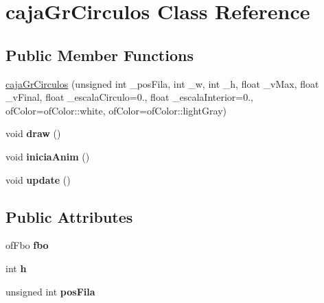 \hypertarget{classcaja_gr_circulos}{}\section{caja\+Gr\+Circulos Class Reference}
\label{classcaja_gr_circulos}
\subsection*{Public Member Functions}
\begin{DoxyCompactItemize}
\item 
\hyperlink{classcaja_gr_circulos_a54ebb2fafbbc7bd4aa13d934d52040a7}{caja\+Gr\+Circulos} (unsigned int \+\_\+pos\+Fila, int \+\_\+w, int \+\_\+h, float \+\_\+v\+Max, float \+\_\+v\+Final, float \+\_\+escala\+Circulo=0., float \+\_\+escala\+Interior=0., of\+Color=of\+Color\+::white, of\+Color=of\+Color\+::light\+Gray)
\item 
\hypertarget{classcaja_gr_circulos_af5b406775d6dc3d4226614bd13920b91}{}void {\bfseries draw} ()\label{classcaja_gr_circulos_af5b406775d6dc3d4226614bd13920b91}

\item 
\hypertarget{classcaja_gr_circulos_a5bf88c348cc168c6c1dfbb113c258a98}{}void {\bfseries inicia\+Anim} ()\label{classcaja_gr_circulos_a5bf88c348cc168c6c1dfbb113c258a98}

\item 
\hypertarget{classcaja_gr_circulos_ad1a0f47dc0a6a7eb52acbc5ddb530587}{}void {\bfseries update} ()\label{classcaja_gr_circulos_ad1a0f47dc0a6a7eb52acbc5ddb530587}

\end{DoxyCompactItemize}
\subsection*{Public Attributes}
\begin{DoxyCompactItemize}
\item 
\hypertarget{classcaja_gr_circulos_ac98d0dd84d7c3bf01515a2105aa94ca6}{}of\+Fbo {\bfseries fbo}\label{classcaja_gr_circulos_ac98d0dd84d7c3bf01515a2105aa94ca6}

\item 
\hypertarget{classcaja_gr_circulos_a1a43900aefa7e2d6023448248cf71620}{}int {\bfseries h}\label{classcaja_gr_circulos_a1a43900aefa7e2d6023448248cf71620}

\item 
\hypertarget{classcaja_gr_circulos_ad08d9eda45829153965ed1cc4e45e1c2}{}unsigned int {\bfseries pos\+Fila}\label{classcaja_gr_circulos_ad08d9eda45829153965ed1cc4e45e1c2}

\end{DoxyCompactItemize}


